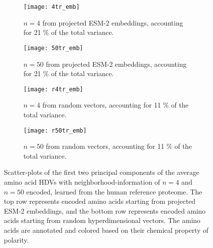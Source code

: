 \begin{figure}[H]
    \centering
    \begin{subfigure}[b]{0.45\textwidth}
        \texttt{[image: 4tr\_emb]}
        \caption{$n = 4$ from projected ESM-2 embeddings, accounting for 21 \% of the total variance.}
        \label{fig:AAtr4}
    \end{subfigure}
    \hfill
    \begin{subfigure}[b]{0.45\textwidth}
        \texttt{[image: 50tr\_emb]}
        \caption{$n = 50$ from projected ESM-2 embeddings, accounting for 21 \% of the total variance.}
        \label{fig:AAtr50}
    \end{subfigure}
    \vspace{10pt} %
    \begin{subfigure}[b]{0.45\textwidth}
        \texttt{[image: r4tr\_emb]}
        \caption{$n = 4$ from random vectors, accounting for 11 \% of the total variance.}
        \label{fig:AArtr4}
    \end{subfigure}
    \hfill
    \begin{subfigure}[b]{0.45\textwidth}
        \texttt{[image: r50tr\_emb]}
        \caption{$n = 50$ from random vectors, accounting for 11 \% of the total variance.}
        \label{fig:AArtr50}
    \end{subfigure}
    \caption{Scatter-plots of the first two principal components of the average amino acid HDVs with neighborhood-information of $n = 4$ and $n = 50$ encoded, learned from the human reference proteome. The top row represents encoded amino acids starting from projected ESM-2 embeddings, and the bottom row represents encoded amino acids starting from random hyperdimensional vectors. The amino acids are annotated and colored based on their chemical property of polarity.}\label{fig:bigfig}
\end{figure}

